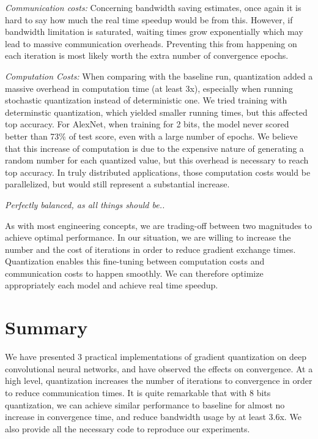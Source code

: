 \documentclass[10pt,conference,compsocconf]{IEEEtran}
\begin{document}
\textit{Communication costs:} Concerning bandwidth saving estimates, once again it is hard to say how much the real time speedup would be from this. However, if bandwidth limitation is saturated, waiting times grow exponentially which may lead to massive communication overheads. Preventing this from happening on each iteration is most likely worth the extra number of convergence epochs. 

\textit{Computation Costs:} When comparing with the baseline run, quantization added a massive overhead in computation time (at least 3x), especially when running stochastic quantization instead of deterministic one. We tried training with determinstic quantization, which yielded smaller running times, but this affected top accuracy. For AlexNet, when training for 2 bits, the model never scored better than 73\% of test score, even with a large number of epochs. We believe that this increase of computation is due to the expensive nature of generating a random number for each quantized value, but this overhead is necessary to reach top accuracy. In truly distributed applications, those computation costs would be parallelized, but would still represent a substantial increase.


\begin{center}
\textit{Perfectly balanced, as all things should be..}
\end{center}

As with most engineering concepts, we are trading-off between two magnitudes to achieve optimal performance. In our situation, we are willing to increase the number and the cost of iterations in order to reduce gradient exchange times. Quantization enables this fine-tuning between computation costs and communication costs to happen smoothly. We can therefore optimize appropriately each model and achieve real time speedup.


\section{Summary}

We have presented 3 practical implementations of gradient quantization on deep convolutional neural networks, and have observed the effects on convergence. At a high level, quantization increases the number of iterations to convergence in order to reduce communication times. It is quite remarkable that with 8 bits quantization, we can achieve similar performance to baseline for almost no increase in convergence time, and reduce bandwidth usage by at least 3.6x. We also provide all the necessary code to reproduce our experiments.
\end{document}
